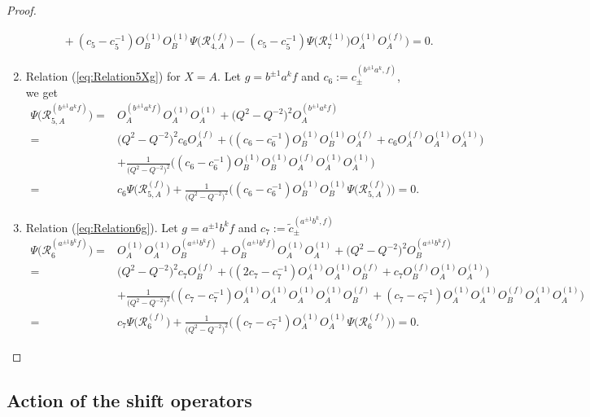 \documentclass{amsart}
\newcommand{\R}{\mathcal R}
\begin{document}
\begin{proof}
\begin{enumerate}[\qquad1.]
\begin{align*}
&\qquad+(c_5-c_5^{-1})O_B^{(1)}O_B^{(1)}\Psi\big(\R_{4,A}^{(f)}\big)-(c_5-c_5^{-1})\Psi\big(\R_{7}^{(1)}\big)O_A^{(1)}O_A^{(f)}\Big)=0.
\end{align*}
\item Relation (\ref{eq:Relation5Xg}) for $X=A$. Let $g=b^{\pm1}a^kf$ and $c_6:=c_{\pm}^{(b^{\pm1}a^k,f)}$, we get
\begin{align*}
\Psi\big(\R_{5,A}^{(b^{\pm1}a^kf)}\big)=&O_A^{(b^{\pm1}a^kf)}O_A^{(1)}O_A^{(1)}+\big(Q^2-Q^{-2}\big)^2O_A^{(b^{\pm1}a^kf)}\\
=&\big(Q^2-Q^{-2}\big)^2c_6O_A^{(f)}+\Big((c_6-c_6^{-1})O_B^{(1)}O_B^{(1)}O_A^{(f)}+c_6O_A^{(f)}O_A^{(1)}O_A^{(1)}\Big)\\
&+\frac1{\big(Q^2-Q^{-2}\big)^2}\Big((c_6-c_6^{-1})O_B^{(1)}O_B^{(1)}O_A^{(f)}O_A^{(1)}O_A^{(1)}\Big)\\
=&c_6\Psi\big(\R_{5,A}^{(f)}\big)+\frac1{\big(Q^2-Q^{-2}\big)^2}\Big((c_6-c_6^{-1})O_B^{(1)}O_B^{(1)}\Psi\big(\R_{5,A}^{(f)}\big)\Big)=0.
\end{align*}
\item Relation (\ref{eq:Relation6g}). Let $g=a^{\pm1}b^kf$ and $c_7:=\widetilde c_{\pm}^{(a^{\pm1}b^k,f)}$
\begin{align*}
\Psi\big(\R_{6}^{(a^{\pm1}b^kf)}\big)=&O_A^{(1)}O_A^{(1)}O_B^{(a^{\pm1}b^kf)}+O_B^{(a^{\pm1}b^kf)}O_A^{(1)}O_A^{(1)}+\big(Q^2-Q^{-2}\big)^2O_B^{(a^{\pm1}b^kf)}\\
=&\big(Q^2-Q^{-2}\big)^2c_7O_B^{(f)}+\Big((2 c_7-c_7^{-1})O_A^{(1)}O_A^{(1)}O_B^{(f)}+c_7O_B^{(f)}O_A^{(1)}O_A^{(1)}\Big)\\
&+\frac1{\big(Q^2-Q^{-2}\big)^2}\Big((c_7-c_7^{-1})O_A^{(1)}O_A^{(1)}O_A^{(1)}O_A^{(1)}O_B^{(f)}+(c_7-c_7^{-1})O_A^{(1)}O_A^{(1)}O_B^{(f)}O_A^{(1)}O_A^{(1)}\Big)\\
=&c_7\Psi\big(\R_{6}^{(f)}\big)+\frac1{\big(Q^2-Q^{-2}\big)^2}\Big((c_7-c_7^{-1})O_A^{(1)}O_A^{(1)}\Psi\big(\R_{6}^{(f)}\big)\Big)=0.
\end{align*}
\end{enumerate}
\end{proof}

\subsection{Action of the shift operators}
\end{document}
